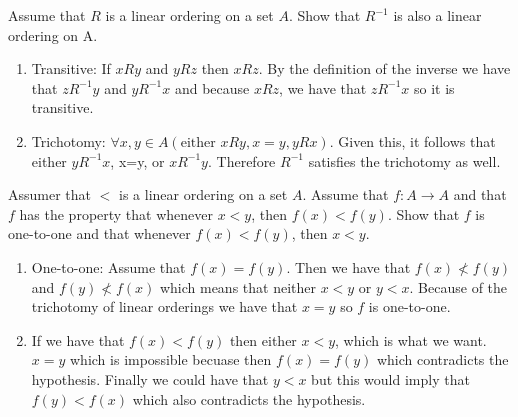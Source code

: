 \documentclass[12pt,letterpaper,boxed]{hmcpset}
\begin{document}
\begin{problem}[3.43]
  Assume that $R$ is a linear ordering on a set $A$. Show that $R^{-1}$ is also a linear ordering on A.
\end{problem}
\begin{solution}
  \begin{enumerate}
    \item Transitive: If $xRy$ and $yRz$ then $xRz$. By the definition of the inverse we have that $zR^{-1}y$ and $yR^{-1}x$ and because $xRz$, we have that $zR^{-1}x$ so it is transitive.
    \item Trichotomy: $\forall x,y\in A (\text{either } xRy, x=y, yRx)$. Given this, it follows that either $yR^{-1}x$, x=y, or $xR^{-1}y$. Therefore $R^{-1}$ satisfies the trichotomy as well.
  \end{enumerate}
\end{solution}

\begin{problem}[3.44]
  Assumer that $<$ is a linear ordering on a set $A$. Assume that $f:A\to A$ and that $f$ has the property that whenever $x<y$, then $f(x) < f(y)$. Show that $f$ is one-to-one and that whenever $f(x) < f(y)$, then $x < y$.
\end{problem}
\begin{solution}
  \begin{enumerate}
    \item One-to-one: Assume that $f(x)=f(y)$. Then we have that $f(x)\not < f(y)$ and $f(y)\not < f(x)$ which means that neither $x<y$ or $y<x$. Because of the trichotomy of linear orderings we have that $x=y$ so $f$ is one-to-one. 
    \item If we have that $f(x) < f(y)$ then either $x<y$, which is what we want. $x=y$ which is impossible becuase then $f(x)=f(y)$ which contradicts the hypothesis. Finally we could have that $y<x$ but this would imply that $f(y)<f(x)$ which also contradicts the hypothesis.
  \end{enumerate}
\end{solution}
\end{document}
